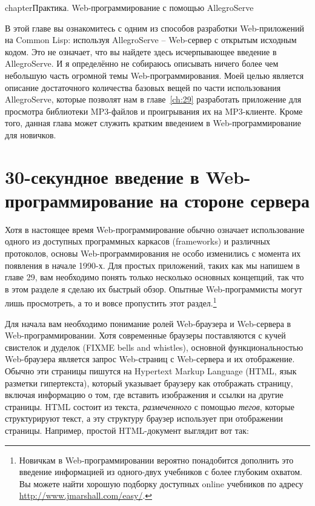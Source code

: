 chapter{Практика. Web-программирование с помощью AllegroServe}
\label{ch:26}

В этой главе вы ознакомитесь с одним из способов разработки Web-приложений на Common Lisp:
используя AllegroServe -- Web-сервер с открытым исходным кодом. Это не означает, что вы
найдете здесь исчерпывающее введение в AllegroServe. И я определённо не собираюсь
описывать ничего более чем небольшую часть огромной темы Web-программирования. Моей целью
является описание достаточного количества базовых вещей по части использования
AllegroServe, которые позволят нам в главе~\ref{ch:29} разработать приложение для
просмотра библиотеки MP3-файлов и проигрывания их на MP3-клиенте. Кроме того, данная глава
может служить кратким введением в Web-программирование для новичков.

\section{30-секундное введение в Web-программирование на стороне сервера}

Хотя в настоящее время Web-программирование обычно означает использование одного из
доступных программных каркасов (frameworks) и различных протоколов, основы
Web-программирования не особо изменились с момента их появления в начале 1990-х. Для
простых приложений, таких как мы напишем в главе 29, вам необходимо понять только
несколько основных концепций, так что в этом разделе я сделаю их быстрый обзор. Опытные
Web-программисты могут лишь просмотреть, а то и вовсе пропустить этот
раздел.\footnote{Новичкам в Web-программировании вероятно понадобится дополнить это
  введение информацией из одного-двух учебников с более глубоким охватом. Вы можете найти
  хорошую подборку доступных online учебников по адресу
  \url{http://www.jmarshall.com/easy/}.}

Для начала вам необходимо понимание ролей Web-браузера и Web-сервера в
Web-программировании. Хотя современные браузеры поставляются с кучей свистелок и дуделок
(FIXME bells and whistles), основной функциональностью Web-браузера является запрос
Web-страниц с Web-сервера и их отображение. Обычно эти страницы пишутся на Hypertext
Markup Language (HTML, язык разметки гипертекста), который указывает браузеру как
отображать страницу, включая информацию о том, где вставить изображения и ссылки на другие
страницы. HTML состоит из текста, \textit{размеченного} с помощью \textit{тегов}, которые
структурируют текст, а эту структуру браузер использует при отображении
страницы. Например, простой HTML-документ выглядит вот так:

